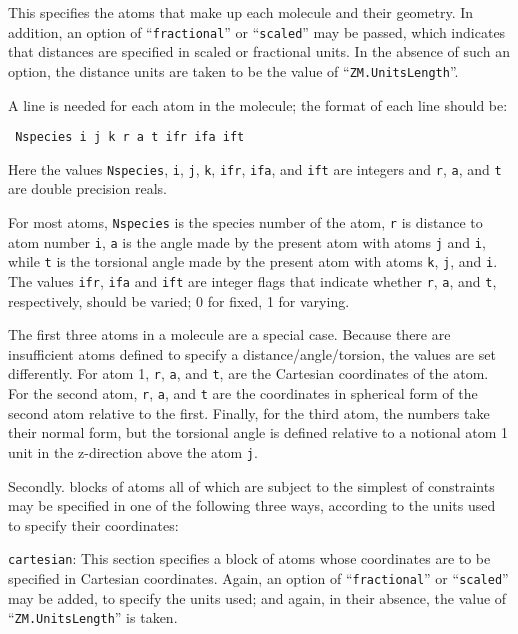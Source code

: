\documentclass[11pt]{article}
\begin{document}
\begin{description}
This specifies the atoms that make up each molecule and their
geometry. In addition, an option of ``\texttt{fractional}'' or ``\texttt{scaled}''
may be passed, which indicates that distances are specified
in scaled or fractional units. In the absence of such an option, the 
distance units are taken to be the value of ``\texttt{ZM.UnitsLength}''.
 
A line is needed for each atom in the molecule; the format of each line should be:

\noindent\texttt{    Nspecies i j k r a t ifr ifa ift}

Here the values \texttt{Nspecies}, \texttt{i}, \texttt{j}, \texttt{k},
\texttt{ifr}, \texttt{ifa}, and \texttt{ift} are integers and
\texttt{r}, \texttt{a}, and \texttt{t} are double precision reals.

For most atoms, \texttt{Nspecies} is the species number of the atom,
\texttt{r} is distance to atom number \texttt{i}, \texttt{a} is the
angle made by the present atom with atoms \texttt{j} and \texttt{i},
while \texttt{t} is the torsional angle made by the present atom with
atoms \texttt{k}, \texttt{j}, and \texttt{i}. The values \texttt{ifr},
\texttt{ifa} and \texttt{ift} are integer flags that indicate whether
\texttt{r}, \texttt{a}, and \texttt{t}, respectively, should be
varied; 0 for fixed, 1 for varying.


The first three atoms in a molecule are a special case. Because there
are insufficient atoms defined to specify a distance/angle/torsion,
the values are set differently. For atom 1, \texttt{r}, \texttt{a},
and \texttt{t}, are the Cartesian coordinates of the atom.  For the
second atom, \texttt{r}, \texttt{a}, and \texttt{t} are the
coordinates in spherical form of the second atom relative to the
first. Finally, for the third atom, the numbers take their normal
form, but the torsional angle is defined relative to a notional atom 1
unit in the z-direction above the atom \texttt{j}.

Secondly. blocks of atoms all of which are subject to the simplest of constraints
may be specified in one of the following three ways, according to the units used
to specify their coordinates:


\item \texttt{cartesian}: This section specifies a block of atoms
whose coordinates are to be specified in Cartesian coordinates. Again,
an option of ``\texttt{fractional}'' or ``\texttt{scaled}'' may be
added, to specify the units used; and again, in their absence, the
value of ``\texttt{ZM.UnitsLength}'' is taken.


\end{description}
\end{document}
